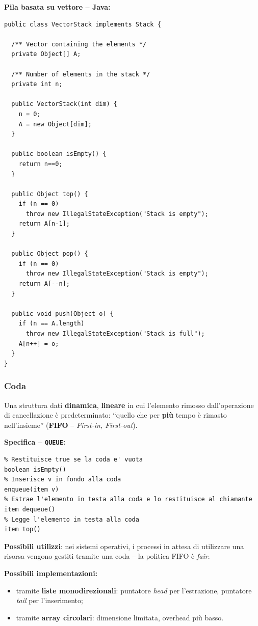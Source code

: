 \documentclass[12pt, a4paper]{article}
\begin{document}
\textbf{Pila basata su vettore -- Java:}
\begin{verbatim}
public class VectorStack implements Stack {

  /** Vector containing the elements */
  private Object[] A;

  /** Number of elements in the stack */
  private int n;

  public VectorStack(int dim) {
    n = 0;
    A = new Object[dim];
  }

  public boolean isEmpty() {
    return n==0;
  }

  public Object top() {
    if (n == 0)
      throw new IllegalStateException("Stack is empty");
    return A[n-1];
  }

  public Object pop() {
    if (n == 0)
      throw new IllegalStateException("Stack is empty");
    return A[--n];
  }

  public void push(Object o) {
    if (n == A.length)
      throw new IllegalStateException("Stack is full");
    A[n++] = o;
  }
}
\end{verbatim}

\subsubsection{Coda}

\begin{tcolorbox}[colback=lightergray!10, colframe=tocsec, title=\textbf{Definizione: Coda (Queue)}]
\label{def:coda}
Una struttura dati \textbf{dinamica}, \textbf{lineare} in cui l'elemento rimosso dall'operazione di cancellazione è predeterminato: ``quello che per \textbf{più} tempo è rimasto nell'insieme'' (\textbf{FIFO} -- \textit{First-in, First-out}).
\end{tcolorbox}

\textbf{Specifica -- \texttt{QUEUE}:}
\begin{verbatim}
% Restituisce true se la coda e' vuota
boolean isEmpty()
% Inserisce v in fondo alla coda
enqueue(item v)
% Estrae l'elemento in testa alla coda e lo restituisce al chiamante
item dequeue()
% Legge l'elemento in testa alla coda
item top()
\end{verbatim}

\textbf{Possibili utilizzi}: nei sistemi operativi, i processi in attesa di utilizzare una risorsa vengono gestiti tramite una coda -- la politica FIFO è \textit{fair}.

\textbf{Possibili implementazioni:}
\begin{itemize}
    \item tramite \textbf{liste monodirezionali}: puntatore \textit{head} per l'estrazione, puntatore \textit{tail} per l'inserimento;
    \item tramite \textbf{array circolari}: dimensione limitata, overhead più basso.
\end{itemize}
\end{document}
